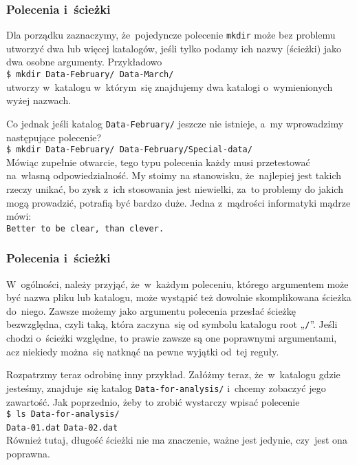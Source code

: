 \documentclass[10pt,t]{beamer}
\begin{document}
\begin{frame}
  \frametitle{Polecenia i~ścieżki}


  Dla porządku zaznaczymy, że~pojedyncze polecenie \texttt{mkdir} może bez
  problemu utworzyć dwa lub więcej katalogów, jeśli tylko podamy ich nazwy
  (ścieżki) jako dwa osobne argumenty. Przykładowo \\
  \texttt{\$ mkdir Data-February/ Data-March/} \\
  utworzy w~katalogu w~którym~się znajdujemy dwa katalogi o~wymienionych
  wyżej nazwach.

  Co jednak jeśli katalog \texttt{Data-February/} jeszcze nie istnieje,
  a~my wprowadzimy następujące polecenie? \\
  \texttt{\$ mkdir Data-February/ Data-February/Special-data/} \\
  Mówiąc zupełnie otwarcie, tego typu polecenia każdy musi przetestować
  na~własną odpowiedzialność. My stoimy na stanowisku, że~najlepiej jest
  takich rzeczy unikać, bo zysk z~ich stosowania jest niewielki, za~to
  problemy do jakich mogą prowadzić, potrafią być bardzo duże. Jedna
  z~mądrości informatyki mądrze mówi: \\
  \texttt{Better to be clear, than clever.}

\end{frame}





\begin{frame}
  \frametitle{Polecenia i~ścieżki}


  W~ogólności, należy przyjąć, że~w~każdym poleceniu, którego argumentem
  może być nazwa pliku lub katalogu, może wystąpić też dowolnie
  skomplikowana ścieżka do~niego. Zawsze możemy jako argumentu polecenia
  przesłać ścieżkę bezwzględna, czyli taką, która zaczyna~się od symbolu
  katalogu root „\texttt{/}”. Jeśli chodzi o~ścieżki względne, to prawie
  zawsze są one poprawnymi argumentami, acz niekiedy można~się natknąć na
  pewne wyjątki od~tej reguły.

  Rozpatrzmy teraz odrobinę inny przykład. Załóżmy teraz, że~w~katalogu
  gdzie jesteśmy, znajduje~się katalog \texttt{Data-for-analysis/}
  i~chcemy zobaczyć jego zawartość. Jak poprzednio, żeby to zrobić wystarczy
  wpisać polecenie \\
  \texttt{\$ ls Data-for-analysis/} \\
  \texttt{Data-01.dat} \quad \texttt{Data-02.dat} \\
  Również tutaj, długość ścieżki nie ma znaczenie, ważne jest jedynie,
  czy~jest ona poprawna.

\end{frame}
\end{document}
